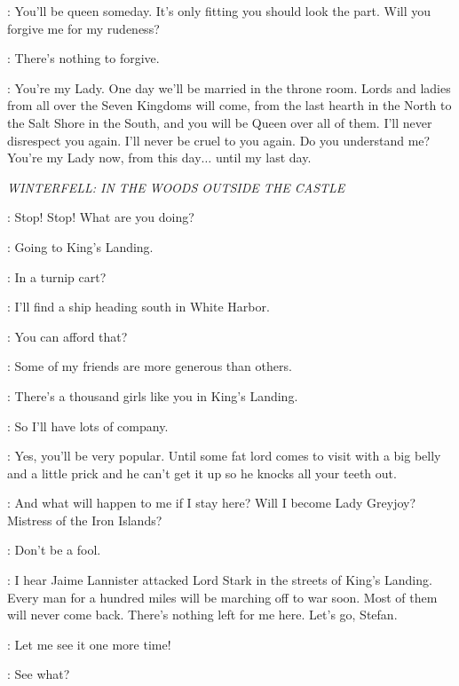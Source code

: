 \JOFFREY: You'll be queen someday. It's only fitting you should look the part. Will you forgive me for my rudeness? 

\SANSA: There's nothing to forgive. 

\JOFFREY: You're my Lady. One day we'll be married in the throne room. Lords and ladies from all over the Seven Kingdoms will come, from the last hearth in the North to the Salt Shore in the South, and you will be Queen over all of them. I'll never disrespect you again. I'll never be cruel to you again. Do you understand me? You're my Lady now, from this day$\ldots$ until my last day. 


\scene

\textit{WINTERFELL: IN THE WOODS OUTSIDE THE CASTLE} 


\THEON: Stop! Stop! What are you doing? 

\ROS: Going to King's Landing. 

\THEON: In a turnip cart? 

\ROS: I'll find a ship heading south in White Harbor. 

\THEON: You can afford that? 

\ROS: Some of my friends are more generous than others. 

\THEON: There's a thousand girls like you in King's Landing. 

\ROS: So I'll have lots of company. 

\THEON: Yes, you'll be very popular. Until some fat lord comes to visit with a big belly and a little prick and he can't get it up so he knocks all your teeth out. 

\ROS: And what will happen to me if I stay here? Will I become Lady Greyjoy? Mistress of the Iron Islands? 

\THEON: Don't be a fool. 

\ROS: I hear Jaime Lannister attacked Lord Stark in the streets of King's Landing. Every man for a hundred miles will be marching off to war soon. Most of them will never come back. There's nothing left for me here.  Let's go, Stefan. 


\THEON: Let me see it one more time! 

\ROS: See what? 

